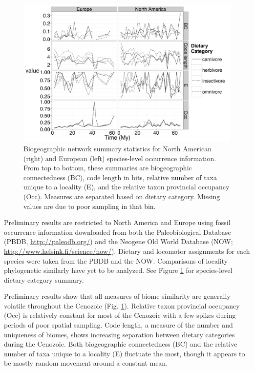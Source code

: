 \documentclass[11pt,letterpaper]{article}
\begin{document}
\begin{figure}[ht]
  \centering
  \includegraphics[width = \textwidth, height = 0.4\textheight, keepaspectratio = true]{figure/diets}
  \caption{Biogeographic network summary statistics for North American (right) and European (left) species-level occurrence information. From top to bottom, these summaries are biogeographic connectedness (BC), code length in bits, relative number of taxa unique to a locality (E), and the relative taxon provincial occupancy (Occ). Measures are separated based on dietary category. Missing values are due to poor sampling in that bin.}
  \label{fig:com}
\end{figure}

Preliminary results are restricted to North America and Europe using fossil occurrence information downloaded from both the Paleobiological Database (PBDB, \url{http://paleodb.org/}) and the Neogene Old World Database (NOW; \url{http://www.helsink.fi/science/now/}). Dietary and locomotor assignments for each species were taken from the PBDB and the NOW. Comparisons of locality phylogenetic similarly have yet to be analyzed. See Figure \ref{fig:com} for species-level dietary category summary. %

Preliminary results show that all measures of biome similarity are generally volatile throughout the Cenozoic (Fig. \ref{fig:com}). Relative taxon provincial occupancy (Occ) is relatively constant for most of the Cenozoic with a few spikes during periods of poor spatial sampling. Code length, a measure of the number and uniqueness of biomes, shows increasing separation between dietary categories during the Cenozoic. Both biogeographic connectedness (BC) and the relative number of taxa unique to a locality (E) fluctuate the most, though it appears to be mostly random movement around a constant mean.
\end{document}
